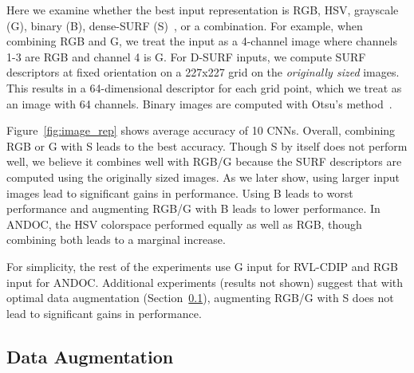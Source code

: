 \documentclass[10pt, conference, compsocconf]{IEEEtran}
\begin{document}
Here we examine whether the best input representation is RGB, HSV, grayscale (G), binary (B), dense-SURF (S)~\cite{bay08}, or a combination.
For example, when combining RGB and G, we treat the input as a 4-channel image where channels 1-3 are RGB and channel 4 is G.
For D-SURF inputs, we compute SURF descriptors at fixed orientation on a 227x227 grid on the \emph{originally sized} images.
This results in a 64-dimensional descriptor for each grid point, which we treat as an image with 64 channels.
Binary images are computed with Otsu's method~\cite{otsu75}.

Figure~\ref{fig:image_rep} shows average accuracy of 10 CNNs.
Overall, combining RGB or G with S leads to the best accuracy.
Though S by itself does not perform well, we believe it combines well with RGB/G because the SURF descriptors are computed using the originally sized images.
As we later show, using larger input images lead to significant gains in performance.
Using B leads to worst performance and augmenting RGB/G with B leads to lower performance.
In ANDOC, the HSV colorspace performed equally as well as RGB, though combining both leads to a marginal increase.

For simplicity, the rest of the experiments use G input for RVL-CDIP and RGB input for ANDOC.
Additional experiments (results not shown) suggest that with optimal data augmentation (Section~\ref{sec:data_aug}), augmenting RGB/G with S does not lead to significant gains in performance.


\subsection{Data Augmentation}
\label{sec:data_aug}
\end{document}
